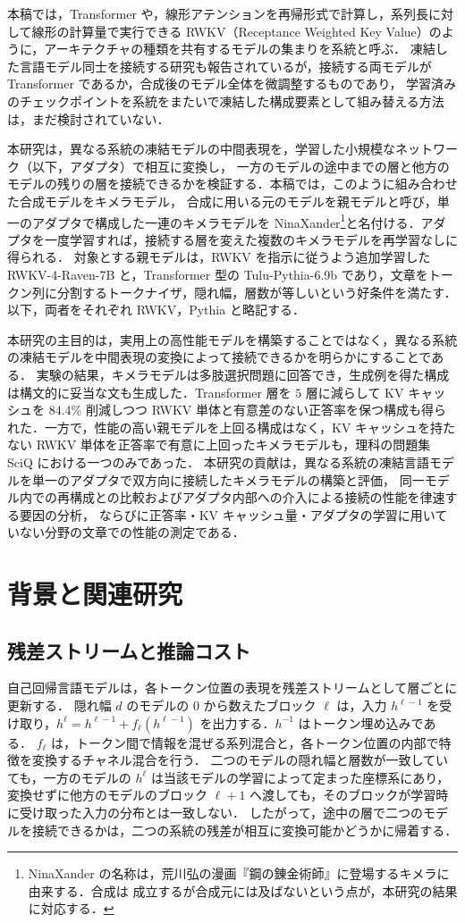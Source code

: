 \documentclass[techrep,noauthor]{ipsj}
\newcommand{\kw}[1]{#1}
\begin{document}
本稿では，Transformer や，線形アテンションを再帰形式で計算し，系列長に対して線形の計算量で実行できる RWKV（Receptance Weighted Key Value）のように，アーキテクチャの種類を共有するモデルの集まりを系統と呼ぶ．
凍結した言語モデル同士を接続する研究も報告されているが，接続する両モデルが Transformer であるか，合成後のモデル全体を微調整するものであり，
学習済みのチェックポイントを系統をまたいで凍結した構成要素として組み替える方法は，まだ検討されていない．

本研究は，異なる系統の凍結モデルの中間表現を，学習した小規模なネットワーク（以下，アダプタ）で相互に変換し，
一方のモデルの途中までの層と他方のモデルの残りの層を接続できるかを検証する．本稿では，このように組み合わせた合成モデルをキメラモデル，
合成に用いる元のモデルを親モデルと呼び，単一のアダプタで構成した一連のキメラモデルを
\kw{NinaXander}\footnote{NinaXander の名称は，荒川弘の漫画『鋼の錬金術師』に登場するキメラに由来する．合成は
成立するが合成元には及ばないという点が，本研究の結果に対応する．}と名付ける．アダプタを一度学習すれば，接続する層を変えた複数のキメラモデルを再学習なしに得られる．
対象とする親モデルは，RWKV を指示に従うよう追加学習した RWKV-4-Raven-7B と，Transformer 型の Tulu-Pythia-6.9b であり，文章をトークン列に分割するトークナイザ，隠れ幅，層数が等しいという好条件を満たす．以下，両者をそれぞれ RWKV，Pythia と略記する．

本研究の主目的は，実用上の高性能モデルを構築することではなく，異なる系統の凍結モデルを中間表現の変換によって接続できるかを明らかにすることである．
実験の結果，キメラモデルは多肢選択問題に回答でき，生成例を得た構成は構文的に妥当な文も生成した．Transformer 層を $5$ 層に減らして KV キャッシュを $84.4\%$ 削減しつつ
RWKV 単体と有意差のない正答率を保つ構成も得られた．一方で，性能の高い親モデルを上回る構成はなく，KV キャッシュを持たない RWKV 単体を正答率で有意に上回ったキメラモデルも，理科の問題集 SciQ における一つのみであった．
本研究の貢献は，異なる系統の凍結言語モデルを単一のアダプタで双方向に接続したキメラモデルの構築と評価，
同一モデル内での再構成との比較およびアダプタ内部への介入による接続の性能を律速する要因の分析，
ならびに正答率・KV キャッシュ量・アダプタの学習に用いていない分野の文章での性能の測定である．

\section{背景と関連研究}\label{sec:related}
\subsection{残差ストリームと推論コスト}
自己回帰言語モデルは，各トークン位置の表現を残差ストリームとして層ごとに更新する．
隠れ幅 $d$ のモデルの $0$ から数えたブロック $\ell$ は，入力 $h^{\ell-1}$ を受け取り，$h^{\ell}=h^{\ell-1}+f_\ell(h^{\ell-1})$ を出力する．$h^{-1}$ はトークン埋め込みである．
$f_\ell$ は，トークン間で情報を混ぜる系列混合と，各トークン位置の内部で特徴を変換するチャネル混合を行う．
二つのモデルの隠れ幅と層数が一致していても，一方のモデルの $h^{\ell}$ は当該モデルの学習によって定まった座標系にあり，
変換せずに他方のモデルのブロック $\ell{+}1$ へ渡しても，そのブロックが学習時に受け取った入力の分布とは一致しない．
したがって，途中の層で二つのモデルを接続できるかは，二つの系統の残差が相互に変換可能かどうかに帰着する．
\end{document}
